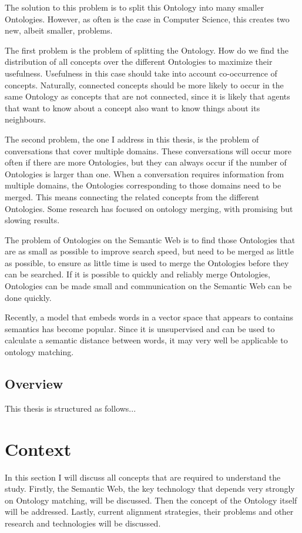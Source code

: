 \documentclass{article}
\begin{document}
 The solution to this problem is to split this Ontology into many smaller Ontologies. However, as often is the case in Computer Science, this creates two new, albeit smaller, problems. 
 
 The first problem is the problem of splitting the Ontology. How do we find the distribution of all concepts over the different Ontologies to maximize their usefulness. Usefulness in this case should take into account co-occurrence of concepts. Naturally, connected concepts should be more likely to occur in the same Ontology as concepts that are not connected, since it is likely that agents that want to know about a concept also want to know things about its neighbours.
 
 The second problem, the one I address in this thesis, is the problem of conversations that cover multiple domains. These conversations will occur more often if there are more Ontologies, but they can always occur if the number of Ontologies is larger than one. When a conversation requires information from multiple domains, the Ontologies corresponding to those domains need to be merged. This means connecting the related concepts from the different Ontologies. Some research has focused on ontology merging, with promising but slowing results.
 
 The problem of Ontologies on the Semantic Web is to find those Ontologies that are as small as possible to improve search speed, but need to be merged as little as possible, to ensure as little time is used to merge the Ontologies before they can be searched. If it is possible to quickly and reliably merge Ontologies, Ontologies can be made small and communication on the Semantic Web can be done quickly.
 
 Recently, a model that embeds words in a vector space that appears to contains semantics has become popular. Since it is unsupervised and can be used to calculate a semantic distance between words, it may very well be applicable to ontology matching.
 
 \subsection{Overview}
 This thesis is structured as follows...
 
\newpage
\section{Context}
 In this section I will discuss all concepts that are required to understand the study. Firstly, the Semantic Web, the key technology that depends very strongly on Ontology matching, will be discussed. Then the concept of the Ontology itself will be addressed. Lastly, current alignment strategies, their problems and other research and technologies will be discussed.
\end{document}
